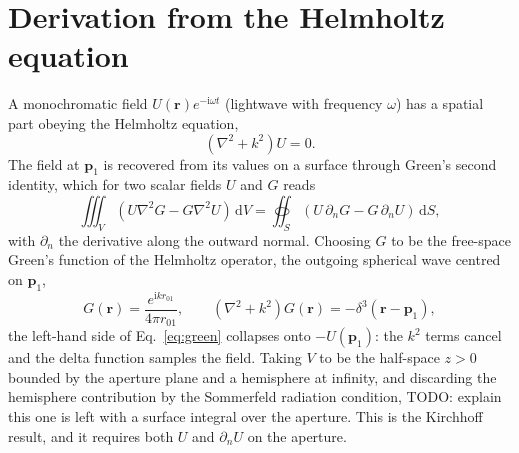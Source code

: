 \documentclass[11pt]{book}
\begin{document}
\section{Derivation from the Helmholtz equation}
\label{sec:rs}

A monochromatic field $U(\mathbf{r})e^{-\mathrm{i}\omega t}$ (lightwave with frequency $\omega$) has a spatial part obeying the Helmholtz equation,
\begin{equation}
(\nabla^2 + k^2)U = 0.
\end{equation}
The field at $\mathbf{p}_1$ is recovered from its values on a surface through Green's second identity, which for two scalar fields $U$ and $G$ reads
\begin{equation}
\iiint_V (U\nabla^2 G - G\nabla^2 U)\,\mathrm{d}V = \oiint_S (U\,\partial_n G - G\,\partial_n U)\,\mathrm{d}S,
\label{eq:green}
\end{equation}
with $\partial_n$ the derivative along the outward normal. Choosing $G$ to be the free-space Green's function of the Helmholtz operator, the outgoing spherical wave centred on $\mathbf{p}_1$,
\begin{equation}
G(\mathbf{r}) = \frac{e^{\mathrm{i}kr_{01}}}{4\pi r_{01}},
\qquad
(\nabla^2+k^2)G(\mathbf r) = -\delta^3(\mathbf{r}-\mathbf{p}_1),
\end{equation}
the left-hand side of Eq.~\eqref{eq:green} collapses onto $-U(\mathbf{p}_1)$: the $k^2$ terms cancel and the delta function samples the field. Taking $V$ to be the half-space $z>0$ bounded by the aperture plane and a hemisphere at infinity, and discarding the hemisphere contribution by the Sommerfeld radiation condition, TODO: explain this one is left with a surface integral over the aperture. This is the Kirchhoff result, and it requires both $U$ and $\partial_n U$ on the aperture.
\end{document}
